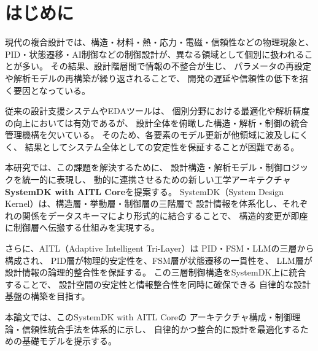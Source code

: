 \section{はじめに}

現代の複合設計では、構造・材料・熱・応力・電磁・信頼性などの物理現象と、
PID・状態遷移・AI制御などの制御設計が、異なる領域として個別に扱われることが多い。
その結果、設計階層間で情報の不整合が生じ、
パラメータの再設定や解析モデルの再構築が繰り返されることで、
開発の遅延や信頼性の低下を招く要因となっている。

従来の設計支援システムやEDAツールは、
個別分野における最適化や解析精度の向上においては有効であるが、
設計全体を俯瞰した構造・解析・制御の統合管理機構を欠いている。
そのため、各要素のモデル更新が他領域に波及しにくく、
結果としてシステム全体としての安定性を保証することが困難である。

本研究では、この課題を解決するために、
設計構造・解析モデル・制御ロジックを統一的に表現し、
動的に連携させるための新しい工学アーキテクチャ
\textbf{SystemDK with AITL Core}を提案する。
SystemDK（System Design Kernel）は、構造層・挙動層・制御層の三階層で
設計情報を体系化し、それぞれの関係をデータスキーマにより形式的に結合することで、
構造的変更が即座に制御層へ伝搬する仕組みを実現する。

さらに、AITL（Adaptive Intelligent Tri-Layer）は
PID・FSM・LLMの三層から構成され、
PID層が物理的安定性を、FSM層が状態遷移の一貫性を、
LLM層が設計情報の論理的整合性を保証する。
この三層制御構造をSystemDK上に統合することで、
設計空間の安定性と情報整合性を同時に確保できる
自律的な設計基盤の構築を目指す。

本論文では、このSystemDK with AITL Coreの
アーキテクチャ構成・制御理論・信頼性統合手法を体系的に示し、
自律的かつ整合的に設計を最適化するための基礎モデルを提示する。

